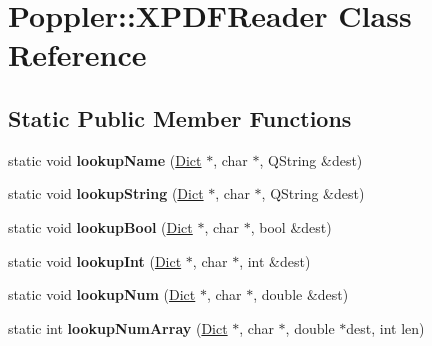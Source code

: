 \hypertarget{class_poppler_1_1_x_p_d_f_reader}{}\section{Poppler\+:\+:X\+P\+D\+F\+Reader Class Reference}
\label{class_poppler_1_1_x_p_d_f_reader}
\subsection*{Static Public Member Functions}
\begin{DoxyCompactItemize}
\item 
\mbox{\label{class_poppler_1_1_x_p_d_f_reader_a059f860628c0ac8caaa2e700f944bb27}} 
static void {\bfseries lookup\+Name} (\hyperlink{class_dict}{Dict} $\ast$, char $\ast$, Q\+String \&dest)
\item 
\mbox{\label{class_poppler_1_1_x_p_d_f_reader_aafc23277bb339d08355c36ad396c4b7a}} 
static void {\bfseries lookup\+String} (\hyperlink{class_dict}{Dict} $\ast$, char $\ast$, Q\+String \&dest)
\item 
\mbox{\label{class_poppler_1_1_x_p_d_f_reader_ad00364fa7198fc8a67f18683fc96a190}} 
static void {\bfseries lookup\+Bool} (\hyperlink{class_dict}{Dict} $\ast$, char $\ast$, bool \&dest)
\item 
\mbox{\label{class_poppler_1_1_x_p_d_f_reader_a07a09e0e1f64dfb75694e1b0e76c6473}} 
static void {\bfseries lookup\+Int} (\hyperlink{class_dict}{Dict} $\ast$, char $\ast$, int \&dest)
\item 
\mbox{\label{class_poppler_1_1_x_p_d_f_reader_afc3cbf45f0d53c17e2760bcb60c8e9bc}} 
static void {\bfseries lookup\+Num} (\hyperlink{class_dict}{Dict} $\ast$, char $\ast$, double \&dest)
\item 
\mbox{\label{class_poppler_1_1_x_p_d_f_reader_ab1e49b360d86c264ac4e56a7dfb2da72}} 
static int {\bfseries lookup\+Num\+Array} (\hyperlink{class_dict}{Dict} $\ast$, char $\ast$, double $\ast$dest, int len)
\item 
\mbox{\label{class_poppler_1_1_x_p_d_f_reader_ac0e80320e3797c3b722592346ec66b67}} 

\end{DoxyCompactItemize}
